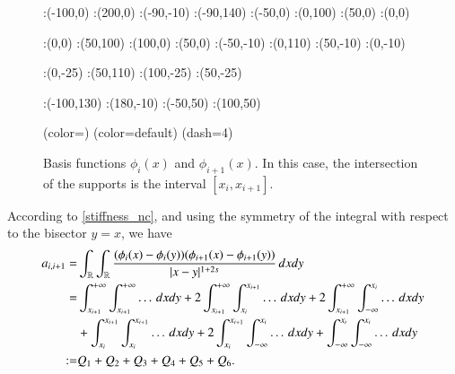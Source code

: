 \begin{figure}[h]
\figinit{0.8pt}
:(-100,0) :(200,0)
:(-90,-10) :(-90,140)
:(-50,0) :(0,100) 
:(50,0) :(0,0)

:(0,0) :(50,100) 
:(100,0) :(50,0)
%
:(-50,-10) :(0,110) 
:(50,-10) :(0,-10)

:(0,-25) :(50,110) 
:(100,-25) :(50,-25)

:(-100,130) :(180,-10)
:(-50,50) :(100,50)

\figdrawbegin{}
\figdrawarrow[1,2]
\figdrawline[3,4]
\figdrawline[4,5]
\figset (color=\Redrgb)
\figdrawline[31,41]
\figdrawline[41,51]
\figset (color=default)
\figset(dash=4)
\figdrawline[4,6]
\figdrawline[41,61]
\figdrawarrow[11,12]

\figdrawend

\centerline{\box\figBoxA}
\caption{Basis functions $\phi_i(x)$ and $\phi_{i+1}(x)$. In this case, the intersection of the supports is the interval $[x_i,x_{i+1}]$.}\label{basis_upp_dia}
\end{figure}

According to \eqref{stiffness_nc}, and using the symmetry of the integral with respect to the bisector $y=x$, we have 
	\begin{align*}
	a_{i,i+1}= & \int_{\mathbb{R}}\int_{\mathbb{R}}\frac{(\phi_i(x)-\phi_i(y))(\phi_{i+1}(x)-\phi_{i+1}(y))}{|x-y|^{1+2s}}\,dxdy
	\\
	= & \int_{x_{i+1}}^{+\infty}\int_{x_{i+1}}^{+\infty} \ldots\,dxdy + 2\int_{x_{i+1}}^{+\infty}\int_{x_i}^{x_{i+1}} \ldots\,dxdy + 2\int_{x_{i+1}}^{+\infty}\int_{-\infty}^{x_i} \ldots\,dxdy 
	\\
	& + \int_{x_i}^{x_{i+1}}\int_{x_i}^{x_{i+1}} \ldots\,dxdy + 2\int_{x_i}^{x_{i+1}}\int_{-\infty}^{x_i} \ldots\,dxdy + \int_{-\infty}^{x_i}\int_{-\infty}^{x_i} \ldots\,dxdy 
	\\
	:= & Q_1 + Q_2 + Q_3 + Q_4 + Q_5 + Q_6.
\end{align*}

